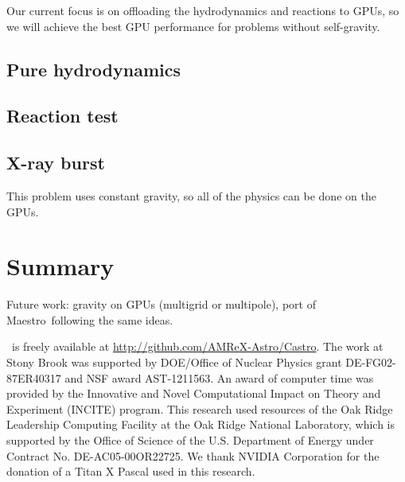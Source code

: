 \documentclass[twocolumn,times]{aastex62}
\newcommand{\castro}{{\sf Castro}}
\newcommand{\maestro}{{\sf Maestro}}
\begin{document}
Our current focus is on offloading the hydrodynamics and reactions to
GPUs, so we will achieve the best GPU performance for problems without
self-gravity.

\subsection{Pure hydrodynamics}

\subsection{Reaction test}

\subsection{X-ray burst}

This problem uses constant gravity, so all of the physics can be done on the GPUs.


\section{Summary}

Future work: gravity on GPUs (multigrid or multipole), port of \maestro\ following
the same ideas.


\acknowledgements \castro\ is freely available at
\url{http://github.com/AMReX-Astro/Castro}.  The work at Stony Brook
was supported by DOE/Office of Nuclear Physics grant DE-FG02-87ER40317
and NSF award AST-1211563.  An award of computer time was provided by
the Innovative and Novel Computational Impact on Theory and Experiment
(INCITE) program.  This research used resources of the Oak Ridge
Leadership Computing Facility at the Oak Ridge National Laboratory,
which is supported by the Office of Science of the U.S. Department of
Energy under Contract No. DE-AC05-00OR22725.  We thank NVIDIA Corporation
for the donation of a Titan X Pascal used in this research.








\end{document}
